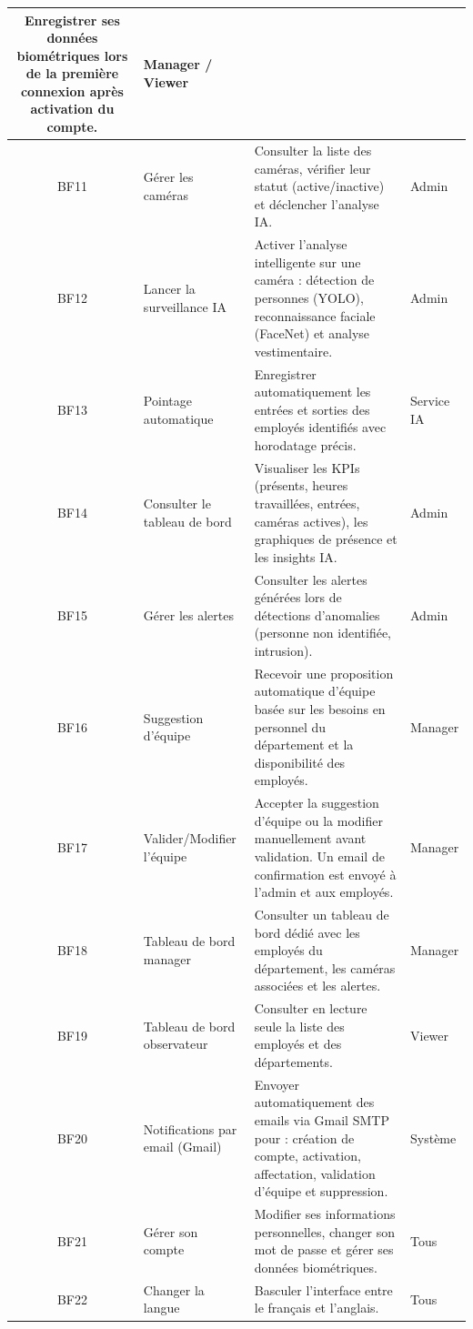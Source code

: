 \documentclass[12pt,a4paper]{report}
\numberwithin{figure}{chapter}
\numberwithin{table}{chapter}
\begin{document}
\begin{longtable}{|c|>{\raggedright\arraybackslash}p{5cm}|>{\raggedright\arraybackslash}p{6cm}|l|}
    Enregistrer ses données biométriques lors de la première connexion après activation du compte. &
    Manager / Viewer \\
  \hline
  BF11 & Gérer les caméras &
    Consulter la liste des caméras, vérifier leur statut (active/inactive) et déclencher l'analyse IA. &
    Admin \\
  \hline
  BF12 & Lancer la surveillance IA &
    Activer l'analyse intelligente sur une caméra : détection de personnes (YOLO), reconnaissance faciale (FaceNet) et analyse vestimentaire. &
    Admin \\
  \hline
  BF13 & Pointage automatique &
    Enregistrer automatiquement les entrées et sorties des employés identifiés avec horodatage précis. &
    Service IA \\
  \hline
  BF14 & Consulter le tableau de bord &
    Visualiser les KPIs (présents, heures travaillées, entrées, caméras actives), les graphiques de présence et les insights IA. &
    Admin \\
  \hline
  BF15 & Gérer les alertes &
    Consulter les alertes générées lors de détections d'anomalies (personne non identifiée, intrusion). &
    Admin \\
  \hline
  BF16 & Suggestion d'équipe &
    Recevoir une proposition automatique d'équipe basée sur les besoins en personnel du département et la disponibilité des employés. &
    Manager \\
  \hline
  BF17 & Valider/Modifier l'équipe &
    Accepter la suggestion d'équipe ou la modifier manuellement avant validation. Un email de confirmation est envoyé à l'admin et aux employés. &
    Manager \\
  \hline
  BF18 & Tableau de bord manager &
    Consulter un tableau de bord dédié avec les employés du département, les caméras associées et les alertes. &
    Manager \\
  \hline
  BF19 & Tableau de bord observateur &
    Consulter en lecture seule la liste des employés et des départements. &
    Viewer \\
  \hline
  BF20 & Notifications par email (Gmail) &
    Envoyer automatiquement des emails via Gmail SMTP pour : création de compte, activation, affectation, validation d'équipe et suppression. &
    Système \\
  \hline
  BF21 & Gérer son compte &
    Modifier ses informations personnelles, changer son mot de passe et gérer ses données biométriques. &
    Tous \\
  \hline
  BF22 & Changer la langue &
    Basculer l'interface entre le français et l'anglais. &
    Tous \\
  \hline
\end{longtable}
\end{document}
